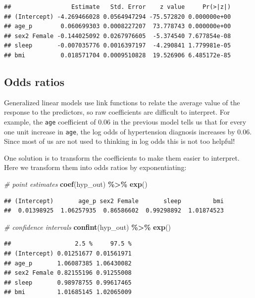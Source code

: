 \documentclass[
]{book}
\newenvironment{Shaded}{\begin{snugshade}}{\end{snugshade}}
\newcommand{\CommentTok}[1]{\textcolor[rgb]{0.56,0.35,0.01}{\textit{#1}}}
\newcommand{\KeywordTok}[1]{\textcolor[rgb]{0.13,0.29,0.53}{\textbf{#1}}}
\newcommand{\NormalTok}[1]{#1}
\newcommand{\OperatorTok}[1]{\textcolor[rgb]{0.81,0.36,0.00}{\textbf{#1}}}
\newcommand{\StringTok}[1]{\textcolor[rgb]{0.31,0.60,0.02}{#1}}
\begin{document}
\begin{verbatim}
##                 Estimate   Std. Error    z value     Pr(>|z|)
## (Intercept) -4.269466028 0.0564947294 -75.572820 0.000000e+00
## age_p        0.060699303 0.0008227207  73.778743 0.000000e+00
## sex2 Female -0.144025092 0.0267976605  -5.374540 7.677854e-08
## sleep       -0.007035776 0.0016397197  -4.290841 1.779981e-05
## bmi          0.018571704 0.0009510828  19.526906 6.485172e-85
\end{verbatim}

\hypertarget{odds-ratios}{%
\subsection{Odds ratios}\label{odds-ratios}}

Generalized linear models use link functions to relate the average value of the response to the predictors, so raw coefficients are difficult to interpret. For example, the \texttt{age} coefficient of 0.06 in the previous model tells us that for every one unit increase in \texttt{age}, the log odds of hypertension diagnosis increases by 0.06. Since most of us are not used to thinking in log odds this is not too helpful!

One solution is to transform the coefficients to make them easier to interpret. Here we transform them into odds ratios by exponentiating:

\begin{Shaded}
\begin{Highlighting}[]
  \CommentTok{\# point estimates}
  \KeywordTok{coef}\NormalTok{(hyp\_out) }\OperatorTok{\%\textgreater{}\%}\StringTok{ }\KeywordTok{exp}\NormalTok{()}
\end{Highlighting}
\end{Shaded}

\begin{verbatim}
## (Intercept)       age_p sex2 Female       sleep         bmi 
##  0.01398925  1.06257935  0.86586602  0.99298892  1.01874523
\end{verbatim}

\begin{Shaded}
\begin{Highlighting}[]
  \CommentTok{\# confidence intervals}
  \KeywordTok{confint}\NormalTok{(hyp\_out) }\OperatorTok{\%\textgreater{}\%}\StringTok{ }\KeywordTok{exp}\NormalTok{()}
\end{Highlighting}
\end{Shaded}

\begin{verbatim}
##                  2.5 %     97.5 %
## (Intercept) 0.01251677 0.01561971
## age_p       1.06087385 1.06430082
## sex2 Female 0.82155196 0.91255008
## sleep       0.98978755 0.99617465
## bmi         1.01685145 1.02065009
\end{verbatim}
\end{document}
